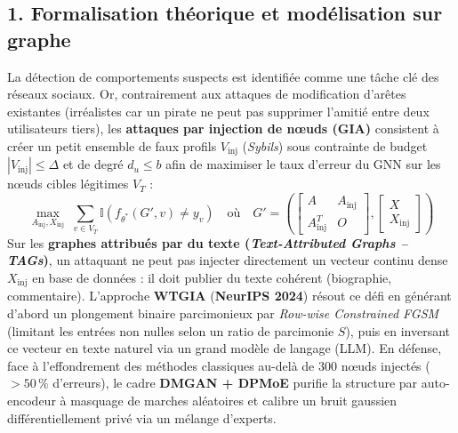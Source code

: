 \documentclass[11pt, a4paper]{article}
\begin{document}
\subsection*{1. Formalisation théorique et modélisation sur graphe}
La détection de comportements suspects est identifiée comme une tâche clé des réseaux sociaux. Or, contrairement aux attaques de modification d'arêtes existantes (irréalistes car un pirate ne peut pas supprimer l'amitié entre deux utilisateurs tiers), les \textbf{attaques par injection de nœuds (GIA)} consistent à créer un petit ensemble de faux profils $V_{\text{inj}}$ (\textit{Sybils}) sous contrainte de budget $|V_{\text{inj}}| \le \Delta$ et de degré $d_u \le b$ afin de maximiser le taux d'erreur du GNN sur les nœuds cibles légitimes $V_T$ :
\[
\max_{A_{\text{inj}}, X_{\text{inj}}} \;\sum_{v \in V_T} \mathbb{I}\!\left( f_{\theta^*}(G', v) \neq y_v \right) \quad \text{où} \quad G' = \left( \begin{bmatrix} A & A_{\text{inj}} \\ A_{\text{inj}}^T & O \end{bmatrix}, \begin{bmatrix} X \\ X_{\text{inj}} \end{bmatrix} \right)
\]
Sur les \textbf{graphes attribués par du texte (\textit{Text-Attributed Graphs -- TAGs})}, un attaquant ne peut pas injecter directement un vecteur continu dense $X_{\text{inj}}$ en base de données : il doit publier du texte cohérent (biographie, commentaire). L'approche \textbf{WTGIA} (\textbf{NeurIPS 2024}) résout ce défi en générant d'abord un plongement binaire parcimonieux par \textit{Row-wise Constrained FGSM} (limitant les entrées non nulles selon un ratio de parcimonie $S$), puis en inversant ce vecteur en texte naturel via un grand modèle de langage (LLM). En défense, face à l'effondrement des méthodes classiques au-delà de 300 nœuds injectés ($>50\,\%$ d'erreurs), le cadre \textbf{DMGAN + DPMoE} purifie la structure par auto-encodeur à masquage de marches aléatoires et calibre un bruit gaussien différentiellement privé via un mélange d'experts.
\end{document}
